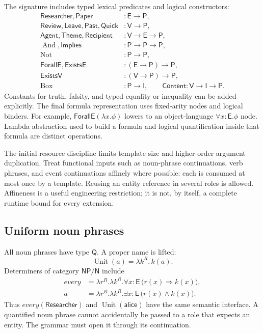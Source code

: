 \documentclass[11pt,a4paper]{article}
\newcommand{\E}{\mathsf{E}}
\newcommand{\V}{\mathsf{V}}
\newcommand{\Prop}{\mathsf{P}}
\newcommand{\Int}{\mathsf{I}}
\newcommand{\Q}{\mathsf{Q}}
\newcommand{\NP}{\mathsf{NP}}
\newcommand{\NC}{\mathsf{N}}
\newcommand{\Unit}{\operatorname{Unit}}
\newcommand{\Bx}{\operatorname{Box}}
\newcommand{\SAnd}{\operatorname{And}}
\newcommand{\Not}{\operatorname{Not}}
\begin{document}
The signature includes typed lexical predicates and logical constructors:
\begin{align*}
 \mathsf{Researcher},\mathsf{Paper}&:\E\to\Prop,\\
 \mathsf{Review},\mathsf{Leave},\mathsf{Past},\mathsf{Quick}&:\V\to\Prop,\\
 \mathsf{Agent},\mathsf{Theme},\mathsf{Recipient}&:\V\to\E\to\Prop,\\
 \SAnd,\mathsf{Implies}&:\Prop\to\Prop\to\Prop,\\
 \Not&:\Prop\to\Prop,\\
 \mathsf{ForallE},\mathsf{ExistsE}&:(\E\to\Prop)\to\Prop,\\
 \mathsf{ExistsV}&:(\V\to\Prop)\to\Prop,\\
 \Bx&:\Prop\to\Int,\qquad
 \mathsf{Content}:\V\to\Int\to\Prop .
\end{align*}
Constants for truth, falsity, and typed equality or inequality can be added
explicitly. The final formula representation uses fixed-arity nodes and
logical binders. For example,
\(\mathsf{ForallE}(\lambda x.\phi)\) lowers to an object-language
\(\forall x{:}\E.\phi\) node. Lambda abstraction used to build a formula and
logical quantification inside that formula are distinct operations.

The initial resource discipline limits template size and higher-order
argument duplication. Treat functional inputs such as noun-phrase
continuations, verb phrases, and event continuations affinely where possible:
each is consumed at most once by a template. Reusing an entity reference in
several roles is allowed. Affineness is a useful engineering restriction;
it is not, by itself, a complete runtime bound for every extension.

\subsection{Uniform noun phrases}
All noun phrases have type \(\Q\). A proper name is lifted:
\begin{equation}
   \Unit(a)=\lambda k^{R}.\,k(a).
\end{equation}
Determiners of category \(\NP/\NC\) include
\begin{align}
 \mathit{every}
   &=\lambda r^{R}.\lambda k^{R}.
       \forall x{:}\E\,\bigl(r(x)\Rightarrow k(x)\bigr),\\
 \mathit{a}
   &=\lambda r^{R}.\lambda k^{R}.
       \exists x{:}\E\,\bigl(r(x)\land k(x)\bigr).
\end{align}
Thus \(\mathit{every}(\mathsf{Researcher})\) and
\(\Unit(\mathsf{alice})\) have the same semantic interface. A quantified noun
phrase cannot accidentally be passed to a role that expects an entity.
The grammar must open it through its continuation.
\end{document}
